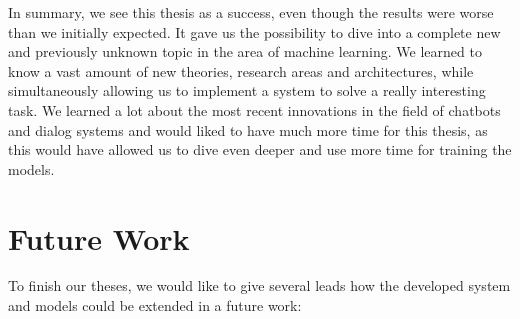 In summary, we see this thesis as a success, even though the results were worse than we initially expected. It gave us the possibility to dive into a complete new and previously unknown topic in the area of machine learning. We learned to know a vast amount of new theories, research areas and architectures, while simultaneously allowing us to implement a system to solve a really interesting task. We learned a lot about the most recent innovations in the field of chatbots and dialog systems and would liked to have much more time for this thesis, as this would have allowed us to dive even deeper and use more time for training the models.

\chapter{Future Work}

To finish our theses, we would like to give several leads how the developed system and models could be extended in a future work:

